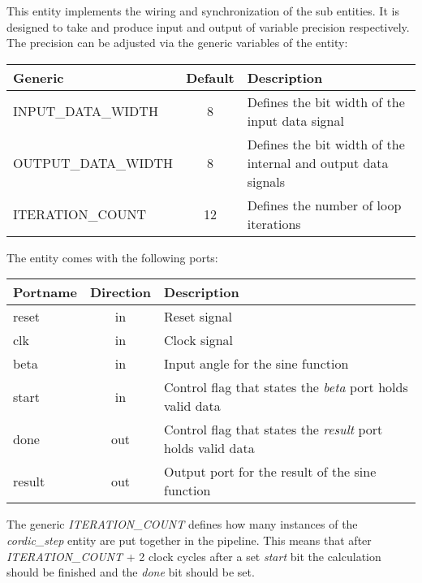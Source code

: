 This entity implements the wiring and synchronization of the sub entities. It is designed to take and produce input and output of variable precision respectively. The precision can be adjusted via the generic variables of the entity:

\begin{center}
	\begin{tabular}{ | l | c | l | }
		\hline
		\textbf{Generic} & \textbf{Default} & \textbf{Description} \\
		\hline
		INPUT\_DATA\_WIDTH & 8 & Defines the bit width of the input data signal \\
		OUTPUT\_DATA\_WIDTH & 8 & Defines the bit width of the internal and output data signals \\
		ITERATION\_COUNT & 12 & Defines the number of loop iterations \\
		\hline
	\end{tabular} 
\end{center}

The entity comes with the following ports:

\begin{center}
	\begin{tabular}{ | l | c | l | }
		\hline
		\textbf{Portname} & \textbf{Direction} & \textbf{Description} \\
		\hline
		reset & in & Reset signal \\
		clk & in  & Clock signal \\
		beta & in  & Input angle for the sine function \\
		start & in & Control flag that states the \textit{beta} port holds valid data \\
		done & out & Control flag that states the \textit{result} port holds valid data \\
		result & out & Output port for the result of the sine function \\
		\hline
	\end{tabular} 
\end{center}

The generic \textit{ITERATION\_COUNT} defines how many instances of the \textit{cordic\_step} entity are put together in the pipeline. This means that after \textit{ITERATION\_COUNT} + 2 clock cycles after a set \textit{start} bit the calculation should be finished and the \textit{done} bit should be set. 
